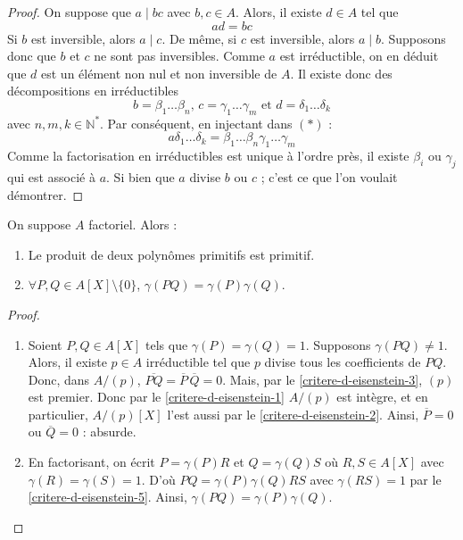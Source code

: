   \begin{proof}
    On suppose que $a \mid bc$ avec $b, c \in A$. Alors, il existe $d \in A$ tel que
    \[ ad = bc \tag{$*$} \]
    Si $b$ est inversible, alors $a \mid c$. De même, si $c$ est inversible, alors $a \mid b$. Supposons donc que $b$ et $c$ ne sont pas inversibles. Comme $a$ est irréductible, on en déduit que $d$ est un élément non nul et non inversible de $A$. Il existe donc des décompositions en irréductibles
    \[ b = \beta_1 \dots \beta_n, \, c = \gamma_1 \dots \gamma_m \text{ et } d = \delta_1 \dots \delta_k \]
    avec $n, m, k \in \mathbb{N}^*$. Par conséquent, en injectant dans $(*)$ :
    \[ a \delta_1 \dots \delta_k = \beta_1 \dots \beta_n \gamma_1 \dots \gamma_m \]
    Comme la factorisation en irréductibles est unique à l'ordre près, il existe $\beta_i$ ou $\gamma_j$ qui est associé à $a$. Si bien que $a$ divise $b$ ou $c$ ; c'est ce que l'on voulait démontrer.
  \end{proof}


  \begin{lemma}[Gauss]
    \label{critere-d-eisenstein-4}
    On suppose $A$ factoriel. Alors :
    \begin{enumerate}[label=(\roman*)]
      \item \label{critere-d-eisenstein-5} Le produit de deux polynômes primitifs est primitif.
      \item $\forall P, Q \in A[X] \setminus \{ 0 \}$, $\gamma(PQ) = \gamma(P) \gamma(Q)$.
    \end{enumerate}
  \end{lemma}

  \begin{proof}
    \begin{enumerate}[label=(\roman*)]
      \item Soient $P, Q \in A[X]$ tels que $\gamma(P) = \gamma(Q) = 1$. Supposons $\gamma(PQ) \neq 1$. Alors, il existe $p \in A$ irréductible tel que $p$ divise tous les coefficients de $PQ$. Donc, dans $A/(p)$, $\overline{PQ} = \overline{P} \, \overline{Q} = 0$.
      \newpar
      Mais, par le \cref{critere-d-eisenstein-3}, $(p)$ est premier. Donc par le \cref{critere-d-eisenstein-1} $A/(p)$ est intègre, et en particulier, $A/(p)[X]$ l'est aussi par le \cref{critere-d-eisenstein-2}. Ainsi, $\overline{P} = 0$ ou $\overline{Q} = 0$ : absurde.
      \item En factorisant, on écrit $P = \gamma(P)R$ et $Q = \gamma(Q)S$ où $R, S \in A[X]$ avec $\gamma(R) = \gamma(S) = 1$. D'où $PQ = \gamma(P)\gamma(Q)RS$ avec $\gamma(RS) = 1$ par le \cref{critere-d-eisenstein-5}. Ainsi, $\gamma(PQ) = \gamma(P) \gamma(Q).$
    \end{enumerate}
  \end{proof}

